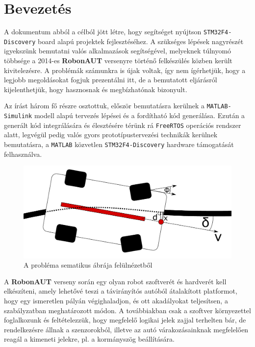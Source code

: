 \section{Bevezetés}

A dokumentum abból a célból jött létre, hogy segítséget nyújtson \verb!STM32F4-Discovery! board alapú projektek fejlesztéséhez. A szükséges lépések nagyrészét igyekszünk bemutatni valós alkalmazások segítségével, melyeknek túlnyomó többsége a 2014-es \textbf{RobonAUT} versenyre történő felkészülés közben került kivitelezésre. A problémák számunkra is újak voltak, így nem ígérhetjük, hogy a legjobb megoldásokat fogjuk prezentálni itt, de a bemutatott eljárásról kijelenthetjük, hogy hasznosnak és megbízhatónak bizonyult.

Az írást három fő részre osztottuk, először bemutatásra kerülnek a \verb!MATLAB-Simulink! modell alapú tervezés lépései és a fordítható kód generálása. Ezután a generált kód integrálására és élesztésére térünk rá \verb!FreeRTOS! operációs rendszer alatt, legvégül pedig valós gyors prototípustervezési technikák kerülnek bemutatásra, a \verb!MATLAB! közvetlen \verb!STM32F4-Discovery! hardware támogatását felhasználva.

\begin{figure}[!ht]
    \centering
    \includegraphics[width=0.9\linewidth]{img/cartop}
    \caption{A probléma sematikus ábrája felülnézetből}
    \label{fig:cartop}
\end{figure}

A \textbf{RobonAUT} verseny során egy olyan robot szoftverét és hardverét kell elkészíteni, amely lehetővé teszi a távirányítós autóból átalakított platformot, hogy egy ismeretlen pályán végighaladjon, és ott akadályokat teljesítsen, a szabályzatban meghatározott módon. A továbbiakban csak a szoftver környezettel foglalkozunk és feltételezzük, hogy megfelelő logikai jelek zajjal terhelten bár, de rendelkezésre állnak a szenzorokból, illetve az autó várakozásainknak megfelelően reagál a kimeneti jelekre, pl. a kormányszög beállítására.

